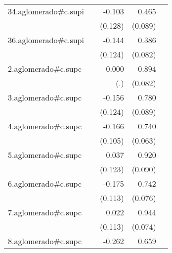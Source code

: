 {\begin{longtable}{l*{4}{D{.}{.}{-1}}}
\addlinespace
34.aglomerado#c.supi&                     &      -0.103         &       0.465\sym{***}&                     \\
            &                     &     (0.128)         &     (0.089)         &                     \\
\addlinespace
36.aglomerado#c.supi&                     &      -0.144         &       0.386\sym{***}&                     \\
            &                     &     (0.124)         &     (0.082)         &                     \\
\addlinespace
2.aglomerado#c.supc&                     &       0.000         &       0.894\sym{***}&                     \\
            &                     &         (.)         &     (0.082)         &                     \\
\addlinespace
3.aglomerado#c.supc&                     &      -0.156         &       0.780\sym{***}&                     \\
            &                     &     (0.124)         &     (0.089)         &                     \\
\addlinespace
4.aglomerado#c.supc&                     &      -0.166         &       0.740\sym{***}&                     \\
            &                     &     (0.105)         &     (0.063)         &                     \\
\addlinespace
5.aglomerado#c.supc&                     &       0.037         &       0.920\sym{***}&                     \\
            &                     &     (0.123)         &     (0.090)         &                     \\
\addlinespace
6.aglomerado#c.supc&                     &      -0.175         &       0.742\sym{***}&                     \\
            &                     &     (0.113)         &     (0.076)         &                     \\
\addlinespace
7.aglomerado#c.supc&                     &       0.022         &       0.944\sym{***}&                     \\
            &                     &     (0.113)         &     (0.074)         &                     \\
\addlinespace
8.aglomerado#c.supc&                     &      -0.262\sym{*}  &       0.659\sym{***}&                     \\

\end{longtable}}
